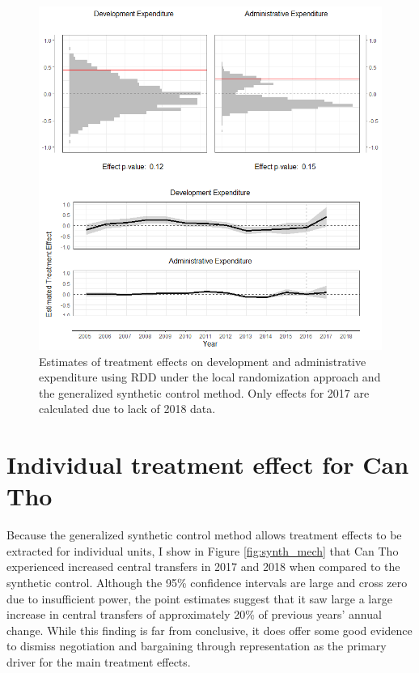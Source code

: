 \documentclass[12pt]{article}
\newcommand{\1}{\mathbbm{1}}
\begin{document}


\begin{figure}[!htbp]
	\centering
	\includegraphics[width=\textwidth]{figure/200205_mech_results.png}
	\captionsetup{singlelinecheck=off}
	\caption[Estimated RDD and synthetic control treatment effects]{Estimates of treatment effects on development and administrative expenditure using RDD under the local randomization approach and the generalized synthetic control method. Only effects for 2017 are calculated due to lack of 2018 data.}
	\label{fig:synth_rdd_mech}
\end{figure}

\clearpage

\section{Individual treatment effect for Can Tho}
\label{app:alt_mech}

Because the generalized synthetic control method allows treatment effects to be extracted for individual units, I show in Figure \ref{fig:synth_mech} that Can Tho experienced increased central transfers in 2017 and 2018 when compared to the synthetic control. Although the 95\% confidence intervals are large and cross zero due to insufficient power, the point estimates suggest that it saw large a large increase in central transfers of approximately 20\% of previous years' annual change. While this finding is far from conclusive, it does offer some good evidence to dismiss negotiation and bargaining through representation as the primary driver for the main treatment effects.
\end{document}
